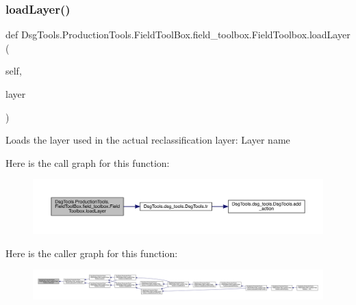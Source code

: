 \subsubsection{\texorpdfstring{load\+Layer()}{loadLayer()}}
{\footnotesize\ttfamily def Dsg\+Tools.\+Production\+Tools.\+Field\+Tool\+Box.\+field\+\_\+toolbox.\+Field\+Toolbox.\+load\+Layer (\begin{DoxyParamCaption}\item[{}]{self,  }\item[{}]{layer }\end{DoxyParamCaption})}

\begin{DoxyVerb}Loads the layer used in the actual reclassification
layer: Layer name
\end{DoxyVerb}
 Here is the call graph for this function\+:
\nopagebreak
\begin{figure}[H]
\begin{center}
\leavevmode
\includegraphics[width=350pt]{class_dsg_tools_1_1_production_tools_1_1_field_tool_box_1_1field__toolbox_1_1_field_toolbox_a8a4fc2d32d5aa1acf49e0cd15a4eedfc_cgraph}
\end{center}
\end{figure}
Here is the caller graph for this function\+:
\nopagebreak
\begin{figure}[H]
\begin{center}
\leavevmode
\includegraphics[width=350pt]{class_dsg_tools_1_1_production_tools_1_1_field_tool_box_1_1field__toolbox_1_1_field_toolbox_a8a4fc2d32d5aa1acf49e0cd15a4eedfc_icgraph}
\end{center}
\end{figure}
\mbox{\label{class_dsg_tools_1_1_production_tools_1_1_field_tool_box_1_1field__toolbox_1_1_field_toolbox_a9fbe4ec85e2198e9a371582c01daf93b}} 
